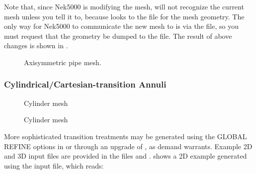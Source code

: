 \documentclass[letterpaper,10pt,english]{sphinxmanual}
\begin{document}
Note that, since Nek5000 is modifying the mesh,  will not
recognize the current mesh unless you tell it to, because 
looks to the  file for the mesh geometry.  The only way for
Nek5000 to communicate the new mesh to  is via the 
file, so you must request that the geometry be dumped to the
 file.
The result of above changes is shown in .

\begin{figure}[htbp]
\centering
\capstart

\noindent{}
\caption{Axisymmetric pipe mesh.}\label{\detokenize{appendix:fig-wavypipe}}\label{\detokenize{appendix:id6}}\end{figure}


\subsubsection{Cylindrical/Cartesian-transition Annuli}
\label{\detokenize{appendix:sec-genbox}}\label{\detokenize{appendix:cylindrical-cartesian-transition-annuli}}
\begin{figure}[htbp]
\centering
\capstart

\noindent{}
\caption{Cylinder mesh}\label{\detokenize{appendix:fig-cylbox-2d}}\label{\detokenize{appendix:id7}}\end{figure}

\begin{figure}[htbp]
\centering
\capstart

\noindent{}
\caption{Cylinder mesh}\label{\detokenize{appendix:fig-cylbox-2da}}\label{\detokenize{appendix:id8}}\end{figure}

More sophisticated
transition treatments may be generated using the GLOBAL REFINE options in
 or through an upgrade of , as demand warrants.
Example 2D and 3D input files are provided in the  files
 and .
 shows a 2D example generated using
the  input file, which reads:
\end{document}
